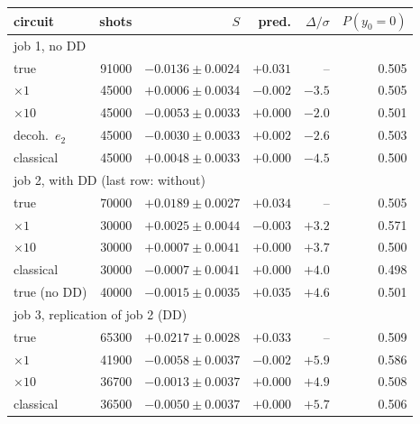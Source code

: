 \begin{tabular}{lrrrrr}
\toprule
circuit & shots & $S$ & pred. & $\Delta/\sigma$ & $P(y_0{=}0)$ \\
\midrule
\multicolumn{6}{l}{job 1, no DD} \\
true & 91000 & $-0.0136\pm0.0024$ & $+0.031$ & -- & 0.505 \\
$\times1$ & 45000 & $+0.0006\pm0.0034$ & $-0.002$ & $-3.5$ & 0.505 \\
$\times10$ & 45000 & $-0.0053\pm0.0033$ & $+0.000$ & $-2.0$ & 0.501 \\
decoh.\ $e_2$ & 45000 & $-0.0030\pm0.0033$ & $+0.002$ & $-2.6$ & 0.503 \\
classical & 45000 & $+0.0048\pm0.0033$ & $+0.000$ & $-4.5$ & 0.500 \\
\midrule
\multicolumn{6}{l}{job 2, with DD (last row: without)} \\
true & 70000 & $+0.0189\pm0.0027$ & $+0.034$ & -- & 0.505 \\
$\times1$ & 30000 & $+0.0025\pm0.0044$ & $-0.003$ & $+3.2$ & 0.571 \\
$\times10$ & 30000 & $+0.0007\pm0.0041$ & $+0.000$ & $+3.7$ & 0.500 \\
classical & 30000 & $-0.0007\pm0.0041$ & $+0.000$ & $+4.0$ & 0.498 \\
true (no DD) & 40000 & $-0.0015\pm0.0035$ & $+0.035$ & $+4.6$ & 0.501 \\
\midrule
\multicolumn{6}{l}{job 3, replication of job 2 (DD)} \\
true & 65300 & $+0.0217\pm0.0028$ & $+0.033$ & -- & 0.509 \\
$\times1$ & 41900 & $-0.0058\pm0.0037$ & $-0.002$ & $+5.9$ & 0.586 \\
$\times10$ & 36700 & $-0.0013\pm0.0037$ & $+0.000$ & $+4.9$ & 0.508 \\
classical & 36500 & $-0.0050\pm0.0037$ & $+0.000$ & $+5.7$ & 0.506 \\
\bottomrule
\end{tabular}
